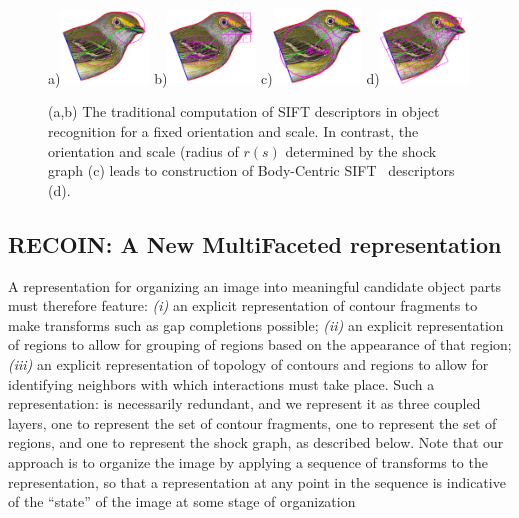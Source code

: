 \begin{figure}[ht]
  \centering
  a)\includegraphics[width=0.21\textwidth]{figs/bird_trad_scale.pdf}
  b)\includegraphics[width=0.21\textwidth]{figs/frag_trad_sift.pdf}
  c)\includegraphics[width=0.21\textwidth]{figs/frag_oellipse.pdf}
  d)\includegraphics[width=0.21\textwidth]{figs/frag_sift.pdf}
\caption{(a,b) The traditional computation of SIFT descriptors in object recognition for a fixed orientation and scale. In contrast, the orientation and scale (radius of $r(s)$ determined by the shock graph (c) leads to construction of Body-Centric SIFT~\cite{Lowe:IJCV04} descriptors (d). }
\label{fig:coord_sys_ops}
\end{figure}

\subsection{RECOIN: A New MultiFaceted representation}
\label{sec:representation}

A representation for organizing an image into meaningful candidate object parts must therefore feature: \emph{(i)} an explicit representation of contour fragments to make transforms such as gap completions possible; \emph{(ii)} an explicit representation of regions to allow for grouping of regions based on the appearance of that region; \emph{(iii)} an explicit representation of topology of contours and regions to allow for identifying neighbors with which interactions must take place. Such a representation: is necessarily redundant, and we represent it as three coupled layers, one to represent the set of contour fragments, one to represent the set of regions, and one to represent the shock graph, as described below. Note that our approach is to organize the image by applying a sequence of transforms to the representation, so that a representation at any point in the sequence is indicative of the “state” of the image at some stage of organization 


